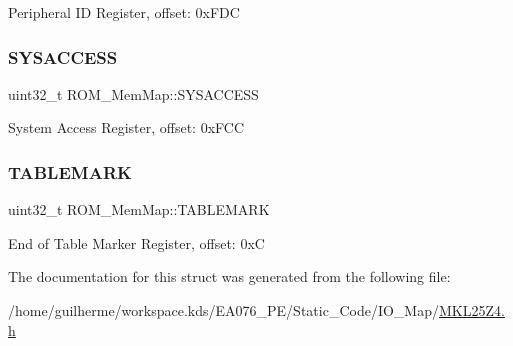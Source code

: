 Peripheral ID Register, offset\+: 0x\+F\+DC \mbox{\label{struct_r_o_m___mem_map_a08aba21ee3870b9eea15463bf46411a4}} 
\subsubsection{\texorpdfstring{S\+Y\+S\+A\+C\+C\+E\+SS}{SYSACCESS}}
{\footnotesize\ttfamily uint32\+\_\+t R\+O\+M\+\_\+\+Mem\+Map\+::\+S\+Y\+S\+A\+C\+C\+E\+SS}

System Access Register, offset\+: 0x\+F\+CC \mbox{\label{struct_r_o_m___mem_map_a663e5f468cf810e6f1d672690b63b141}} 
\subsubsection{\texorpdfstring{T\+A\+B\+L\+E\+M\+A\+RK}{TABLEMARK}}
{\footnotesize\ttfamily uint32\+\_\+t R\+O\+M\+\_\+\+Mem\+Map\+::\+T\+A\+B\+L\+E\+M\+A\+RK}

End of Table Marker Register, offset\+: 0xC 

The documentation for this struct was generated from the following file\+:\begin{DoxyCompactItemize}
\item 
/home/guilherme/workspace.\+kds/\+E\+A076\+\_\+\+P\+E/\+Static\+\_\+\+Code/\+I\+O\+\_\+\+Map/\hyperlink{_m_k_l25_z4_8h}{M\+K\+L25\+Z4.\+h}\end{DoxyCompactItemize}
